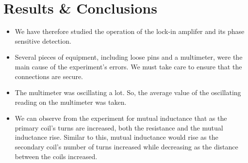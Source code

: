 \section{Results \& Conclusions}

	\begin{itemize}
		\item We have therefore studied the operation of the lock-in amplifer and its phase sensitive detection.
		\item Several pieces of equipment, including loose pins and a multimeter, were the main cause of the experiment's errors. We must take care to ensure that the connections are secure.
		\item The multimeter was oscillating a lot. So, the average value of the oscillating reading on the multimeter was taken.
		\item We can observe from the experiment for mutual inductance that as the primary coil's turns are increased, both the resistance and the mutual inductance rise. Similar to this, mutual inductance would rise as the secondary coil's number of turns increased while decreasing as the distance between the coils increased.
	\end{itemize}
